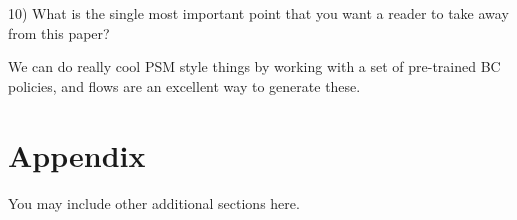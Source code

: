 \documentclass{article} %
\begin{document}
10) What is the single most important point that you want a reader to take away from this paper?

We can do really cool PSM style things by working with a set of pre-trained BC policies, and flows are an excellent way to generate these.













\appendix
\section{Appendix}
You may include other additional sections here.
\end{document}
